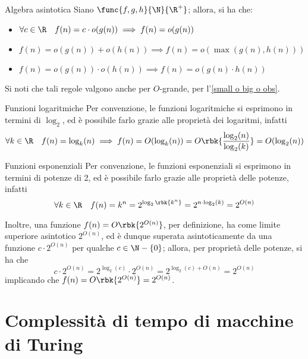 \documentclass[a4paper, 12pt]{report}
\begin{document}
    \begin{framedprop}[label={alg asintotica}]{Algebra asintotica}
        Siano $\func{f, g, h}{\N}{\R^+}$; allora, si ha che:
        
        \begin{itemize}
            \item $\forall c \in \R \quad f(n) = c \cdot o(g(n)) \implies f(n) = o(g(n))$
            \item $f(n) = o(g(n)) + o(h(n)) \implies f(n) = o(\max(g(n), h(n)))$
            \item $f(n) = o(g(n)) \cdot o(h(n)) \implies f(n) = o(g(n) \cdot h(n))$
        \end{itemize}

        Si noti che tali regole valgono anche per $O$-grande, per l'\cref{small o big o obs}.
    \end{framedprop}

    \begin{framedobs}[label={fn log}]{Funzioni logaritmiche}
        Per convenzione, le funzioni logaritmiche si esprimono in termini di $\log_2$, ed è possibile farlo grazie alle proprietà dei logaritmi, infatti $$\forall k \in \R \quad f(n) = \log_k(n) \implies f(n) = O(\log_k(n)) = O \rbk{\dfrac{\log_2(n)}{\log_2(k)}} = O(\log_2(n))$$
    \end{framedobs}

    \begin{framedobs}[label={fn exp}]{Funzioni esponenziali}
        Per convenzione, le funzioni esponenziali si esprimono in termini di potenze di 2, ed è possibile farlo grazie alle proprietà delle potenze, infatti $$\forall k \in \R \quad f(n) = k^n = 2^{\log_2\rbk{k^n}} = 2^{n \cdot \log_2 (k)} = 2^{O(n)}$$

        Inoltre, una funzione $f(n) = O\rbk{2^{O(n)}}$, per definizione, ha come limite superiore asintotico $2^{O(n)}$, ed è dunque superata asintoticamente da una funzione $c \cdot 2^{O(n)}$ per qualche $c \in \N - \{0\}$; allora, per proprietà delle potenze, si ha che $$c \cdot 2^{O(n)} = 2^{\log_2(c)} \cdot 2^{O(n)} = 2^{\log_2(c) + O(n)} = 2^{O(n)}$$ implicando che $f(n) = O\rbk{2^{O(n)}} = 2^{O(n)}$.
    \end{framedobs}

    \section{Complessità di tempo di macchine di Turing}
\end{document}
